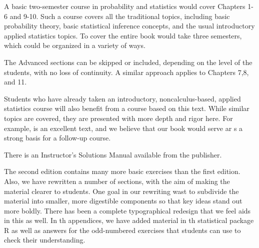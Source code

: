 A basic two-semester course in probability and statistics would cover Chapters 1-6 and 9-10. Such a course covers all the traditional topics, including basic probability theory, basic statistical inference concepts, and the usual introductory applied statistics topics.  To cover the entire book would take three semesters, which could be organized in a variety of ways.

The Advanced sections can be skipped or included, depending on the level of the students, with no loss of continuity. A similar approach applies to Chapters 7,8, and 11.

Students who have already taken an introductory, noncalculus-based, applied statistics course will also benefit from a course based on this text. While similar topics are covered, they are presented with more depth and rigor here. For example, \cite{B3} is an excellent text, and we believe that our book would serve ar s a strong basis for a follow-up course.

There is an Instructor's Solutions Manual available from the publisher.

The second edition contains many more basic exercises than the first edition. Also, we have rewritten a number of sections, with the aim of making the material clearer to students. One goal in our rewriting wast to subdivide the material into smaller, more digestible components so that key ideas stand out more boldly. There has been a complete typographical redesign that we feel aids in this as well. In th appendices, we have added material in th statistical package R as well as answers for the odd-numbered exercises that students can use to check their understanding.